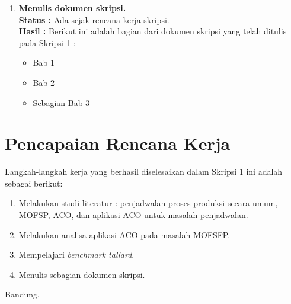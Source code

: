 \documentclass[a4paper,twoside]{article}
\begin{document}
\begin{enumerate}
\begin{itemize}
		\end{itemize}
		

		\item \textbf{Menulis dokumen skripsi.}\\
		{\bf Status :} Ada sejak rencana kerja skripsi.\\
		{\bf Hasil :} Berikut ini adalah bagian dari dokumen skripsi yang telah ditulis pada Skripsi 1 : 
		\begin{itemize}
		\item Bab 1
		\item Bab 2
		\item Sebagian Bab 3
		\end{itemize}

	
		

	\end{enumerate}

\section{Pencapaian Rencana Kerja}
Langkah-langkah kerja yang berhasil diselesaikan dalam Skripsi 1 ini adalah sebagai berikut:
\begin{enumerate}
\item Melakukan studi literatur : penjadwalan proses produksi secara umum, MOFSP, ACO, dan aplikasi ACO untuk masalah penjadwalan.
\item Melakukan analisa aplikasi ACO pada masalah MOFSFP.
\item Mempelajari {\it benchmark taliard}.
\item Menulis sebagian dokumen skripsi.
\end{enumerate}





\vspace{1cm}
\centering Bandung, \tanggal\\
\vspace{2cm} \nama \\ 
\vspace{1cm}
\end{document}
